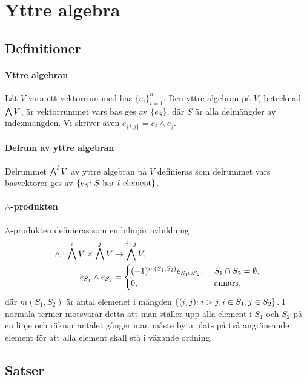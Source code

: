 \section{Yttre algebra}

\subsection{Definitioner}

\paragraph{Yttre algebran}
Låt $V$ vara ett vektorrum med bas $\{e_{i}\}_{i = 1}^{n}$. Den yttre algebran på $V$, betecknad $\bigwedge{V}$, är vektorrummet vars bas ges av $\{e_{S}\}$, där $S$ är alla delmängder av indexmängden. Vi skriver även $e_{\{i, j\}} = e_{i}\wedge e_{j}$.

\paragraph{Delrum av yttre algebran}
Delrummet $\bigwedge^{l}V$ av yttre algebran på $V$ definieras som delrummet vars basvektorer ges av $\set{e_{S}}{S\text{ har }l\text{ element}}$.

\paragraph{$\wedge$-produkten}
$\wedge$-produkten definieras som en bilinjär avbildning
\begin{align*}
	\wedge: \bigwedge^{i}V\times\bigwedge^{j}V &\to \bigwedge^{i + j}V, \\
	e_{S_{1}}\wedge e_{S_{2}}              &=
	\begin{cases}
		(-1)^{m(S_{1}, S_{2})}e_{S_{1}\cup S_{2}},\ &S_{1}\cap S_{2} = \emptyset, \\
		0,                                          &\text{annars},
	\end{cases}
\end{align*}
där $m(S_{1}, S_{2})$ är antal elemenet i mängden $\set{(i, j)}{i > j, i\in S_{1}, j\in S_{2}}$. I normala termer motsvarar detta att man ställer upp alla element i $S_{1}$ och $S_{2}$ på en linje och räknar antalet gånger man måste byta plats på två angränsande element för att alla element skall stå i växande ordning.

\subsection{Satser}

